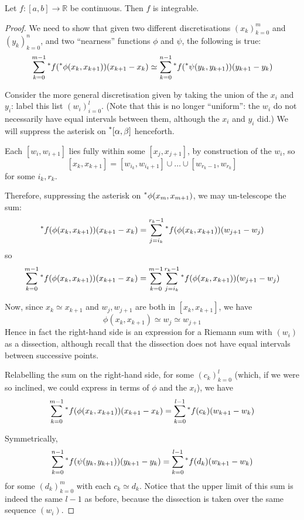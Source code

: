 \documentclass[11pt]{amsart}
\theoremstyle{remark}
\newcommand{\hyp}[1][\mathbb{R}]{\prescript{*}{}{#1}}
\newcommand{\near}{\simeq}
\begin{document}
\begin{thm}
Let $f: [a,b] \to \mathbb{R}$ be continuous. Then $f$ is integrable.
\end{thm}
\begin{proof}
We need to show that given two different discretisations $(x_k)_{k=0}^m$ and $(y_k)_{k=0}^n$, and two ``nearness'' functions $\phi$ and $\psi$, the following is true:
$$\sum_{k=0}^{m-1} \hyp[f](\hyp[\phi](x_k, x_{k+1}))(x_{k+1}-x_k) \near \sum_{k=0}^{n-1} \hyp[f](\hyp[\psi](y_k, y_{k+1})) (y_{k+1}-y_k)$$

Consider the more general discretisation given by taking the union of the $x_i$ and $y_i$: label this list $(w_i)_{i=0}^l$.
(Note that this is no longer ``uniform'': the $w_i$ do not necessarily have equal intervals between them, although the $x_i$ and $y_i$ did.)
We will suppress the asterisk on $\hyp[[]\alpha, \beta]$ henceforth.

Each $[w_i, w_{i+1}]$ lies fully within some $[x_j, x_{j+1}]$, by construction of the $w_i$, so $$[x_k, x_{k+1}] = [w_{i_k}, w_{i_k+1}] \cup \dots \cup [w_{r_k-1}, w_{r_k}]$$
for some $i_k, r_k$.

Therefore, suppressing the asterisk on $\hyp[\phi](x_m, x_{m+1})$, we may un-telescope the sum:
$$\hyp[f](\phi(x_k, x_{k+1})) (x_{k+1} - x_k) = \sum_{j=i_k}^{r_k-1} \hyp[f](\phi(x_k, x_{k+1}))(w_{j+1}-w_j)$$
so
$$\sum_{k=0}^{m-1} \hyp[f](\phi(x_k, x_{k+1})) (x_{k+1} - x_k) = \sum_{k=0}^{m-1} \sum_{j=i_k}^{r_k-1} \hyp[f](\phi(x_k, x_{k+1})) (w_{j+1}-w_j)$$

Now, since $x_k \near x_{k+1}$ and $w_j, w_{j+1}$ are both in $[x_k, x_{k+1}]$, we have $$\phi(x_k, x_{k+1}) \near w_j \near w_{j+1}$$
Hence in fact the right-hand side is an expression for a Riemann sum with $(w_i)$ as a dissection, although recall that the dissection does not have equal intervals between successive points.

Relabelling the sum on the right-hand side, for some $(c_k)_{k=0}^l$ (which, if we were so inclined, we could express in terms of $\phi$ and the $x_i$), we have $$\sum_{k=0}^{m-1} \hyp[f](\phi(x_k, x_{k+1}))(x_{k+1}-x_k) = \sum_{k=0}^{l-1} \hyp[f](c_k) (w_{k+1}-w_k)$$

Symmetrically, $$\sum_{k=0}^{n-1} \hyp[f](\psi(y_k, y_{k+1})) (y_{k+1}-y_k) = \sum_{k=0}^{l-1} \hyp[f](d_k) (w_{k+1}-w_k)$$ for some $(d_k)_{k=0}^m$ with each $c_k \near d_k$.
Notice that the upper limit of this sum is indeed the same $l-1$ as before, because the dissection is taken over the same sequence $(w_i)$.


\end{proof}
\end{document}

